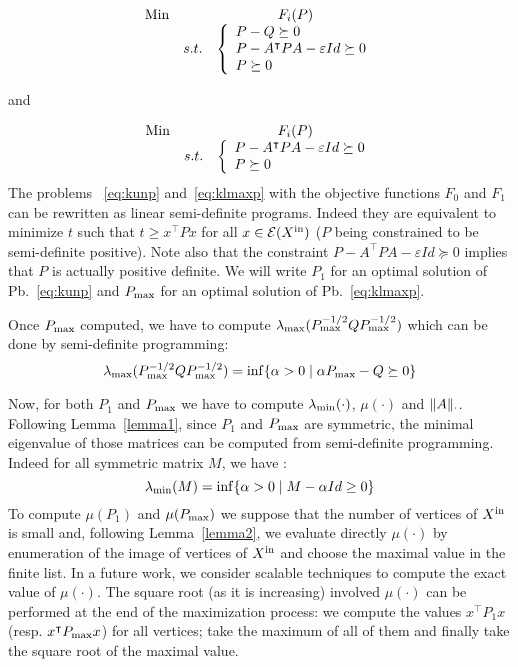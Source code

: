 \documentclass[10pt]{article}
\begin{document}
\begin{equation}
\label{eq:kunp}
\begin{array}{llc}
\operatorname*{Min} & &F_i(P)\\
 & s. t. &\left\{\begin{array}{l} 
         P-Q\succeq 0\\
         P-A^\intercal P A-\varepsilon Id\succeq 0\\
         P\succeq  0
        \end{array}\right.
\end{array}
\end{equation}

and

\begin{equation}
\label{eq:klmaxp}
\begin{array}{llc}
\operatorname*{Min} & & F_i(P)\\
 & s. t. &\left\{\begin{array}{l} 
         P-A^\intercal P A-\varepsilon Id\succeq 0\\
         P\succeq  0
        \end{array}\right.
\end{array}
\end{equation}
The problems ~\eqref{eq:kunp} and~\eqref{eq:klmaxp} with the objective functions $F_0$ and $F_1$ can be rewritten as linear semi-definite programs. Indeed they are equivalent to minimize $t$ such that $t\geq x^\intercal P x$ for all $x\in\mathcal{E}( X^\mathrm{in})$ ($P$ being constrained to be semi-definite positive). Note also that the constraint $P-A^\intercal P A-\varepsilon Id\succeq 0$ implies that $P$ is actually positive definite.  
We will write $P_1$ for an optimal solution of Pb.~\eqref{eq:kunp} and $P_{\mathrm{max}}$ for an optimal solution of Pb.~\eqref{eq:klmaxp}. 


Once $P_{\mathrm{max}}$ computed, we have to compute $\lambda_{\operatorname{max}}(P_{\mathrm{max}}^{-1/2}Q P_{\mathrm{max}}^{-1/2})$ which can be done by semi-definite programming:
\[
\lambda_{\operatorname{max}}(P_{\mathrm{max}}^{-1/2}Q P_{\mathrm{max}}^{-1/2})=\inf\{\alpha>0\mid \alpha P_{\mathrm{max}}-Q\succeq 0\}
\] 

Now, for both $P_1$ and $P_{\mathrm{max}}$ we have to compute $\lambda_{\operatorname{min}}(\cdot)$, $\mu(\cdot)$ and $\| A\|_{\cdot}$. Following Lemma~\ref{lemma1}, since $P_1$ and $P_{\mathrm{max}}$ are symmetric, the minimal eigenvalue
of those matrices can be computed from semi-definite programming. Indeed for all symmetric matrix $M$, we have : 
\[
\lambda_{\operatorname{min}}(M)=\inf\{\alpha>0\mid M-\alpha Id\geq 0\}
\] 
To compute $\mu(P_1)$ and $\mu(P_{\mathrm{max}})$ we suppose that the number of vertices of $X^\mathrm{in}$ is small and, following Lemma~\ref{lemma2}, we evaluate directly $\mu(\cdot)$ by enumeration of the image of vertices of $X^\mathrm{in}$ and choose the maximal value in the finite list. In a future work, we consider scalable techniques to compute the exact value of $\mu(\cdot)$. The square root (as it is increasing) involved $\mu(\cdot)$ can be performed at the end of the maximization process: we compute the values $x^\intercal P_1 x$ (resp. $x^\intercal P_{\mathrm{max}} x$) for all vertices; take the maximum of all of them and finally take the square root of the maximal value. 
\end{document}
